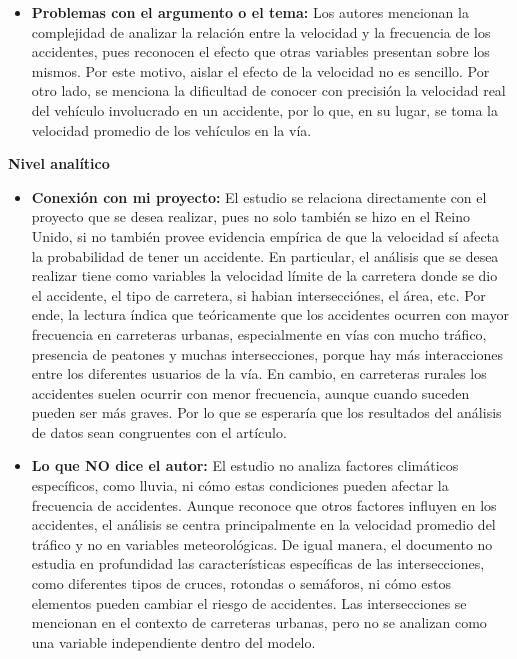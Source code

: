\documentclass[12pt]{article}
\begin{document}
\begin{itemize}
    \item \textbf{Problemas con el argumento o el tema:} Los autores mencionan la 
    complejidad de analizar la relación entre la velocidad y la frecuencia de los 
    accidentes, pues reconocen el efecto que otras variables presentan sobre los
    mismos. Por este motivo, aislar el efecto de la velocidad no es sencillo. Por 
    otro lado, se menciona la dificultad de conocer con precisión la velocidad real 
    del vehículo involucrado en un accidente, por lo que, en su lugar, se toma la
    velocidad promedio de los vehículos en la vía.  \\
    \end{itemize}

\textbf{Nivel analítico}

\begin{itemize}
  \item \textbf{Conexión con mi proyecto:} El estudio se relaciona directamente 
  con el proyecto que se desea realizar, pues no solo también se hizo en el Reino 
  Unido, si no también provee evidencia empírica de que la velocidad sí afecta la
  probabilidad de tener un accidente. En particular, el análisis que se desea realizar 
  tiene como variables la velocidad límite de la carretera donde se dio el accidente, 
  el tipo de carretera, si habian intersecciónes, el área, etc. Por ende, la lectura 
  índica que teóricamente que los accidentes ocurren con mayor frecuencia en carreteras 
  urbanas, especialmente en vías con mucho tráfico, presencia de peatones y muchas 
  intersecciones, porque hay más interacciones entre los diferentes usuarios de la vía. 
  En cambio, en carreteras rurales los accidentes suelen ocurrir con menor frecuencia, 
  aunque cuando suceden pueden ser más graves. Por lo que se esperaría que los resultados 
  del análisis de datos sean congruentes con el artículo.  
 
	\item \textbf{Lo que NO dice el autor:} El estudio no analiza factores climáticos 
	específicos, como lluvia, ni cómo estas condiciones pueden afectar la frecuencia 
	de accidentes. Aunque reconoce que otros factores influyen en los accidentes, el 
	análisis se centra principalmente en la velocidad promedio del tráfico y no en 
	variables meteorológicas. De igual manera, el documento no estudia en profundidad 
	las características específicas de las intersecciones, como diferentes tipos de cruces, 
	rotondas o semáforos, ni cómo estos elementos pueden cambiar el riesgo de accidentes. 
	Las intersecciones se mencionan en el contexto de carreteras urbanas, pero no se 
	analizan como una variable independiente dentro del modelo. 


\end{itemize}
\end{document}
